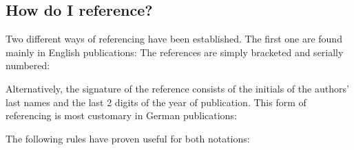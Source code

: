\subsection{How do I reference?}

Two different ways of referencing have been established. The first one are
found mainly in English publications: The references are simply bracketed and
serially numbered:

\begin{quotation}  
\end{quotation}

Alternatively, the signature of the reference consists of the initials
of the authors' last names and the last 2 digits of the year of publication.
This form of referencing is most customary in German publications:

\begin{quotation}  
\end{quotation}

The following rules have proven useful for both notations:

